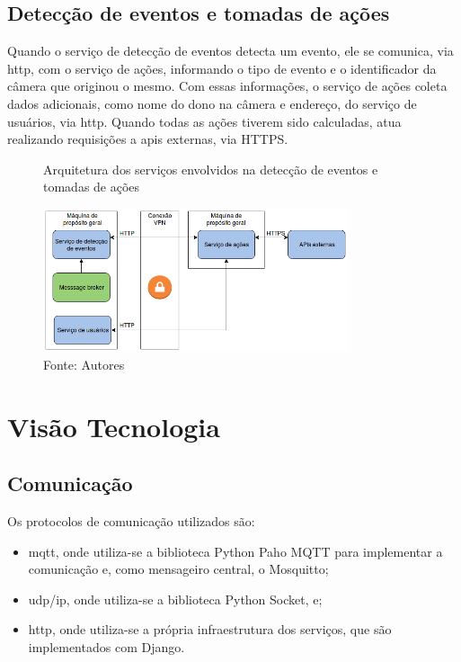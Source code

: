 \documentclass[]{politex}
\begin{document}
\subsection{Detecção de eventos e tomadas de ações}
Quando o serviço de detecção de eventos detecta um evento, ele se comunica, via \acrshort{http}, com o serviço de ações, informando o tipo de evento e o identificador da câmera que originou o mesmo. Com essas informações, o serviço de ações coleta dados adicionais, como nome do dono na câmera e endereço, do serviço de usuários, via \acrshort{http}. Quando todas as ações tiverem sido calculadas, atua realizando requisições a \acrshort{api}s externas, via HTTPS.

\begin{figure}[H]
    \centering
    \caption{Arquitetura dos serviços envolvidos na detecção de eventos e tomadas de ações}
    \includegraphics[width=0.8\textwidth]{arquitetura_acoes}
    \caption*{Fonte: Autores}
    \label{fig:arquitetura_acoes}
\end{figure}

\section{Visão Tecnologia}

\subsection{Comunicação}
Os protocolos de comunicação utilizados são:
\begin{itemize}
    \item \acrshort{mqtt}, onde utiliza-se a biblioteca Python Paho MQTT para implementar a comunicação e, como mensageiro central, o Mosquitto;
    \item \acrlong{udp}/\acrshort{ip}, onde utiliza-se a biblioteca Python Socket, e;
    \item \acrshort{http}, onde utiliza-se a própria infraestrutura dos serviços, que são implementados com Django.
\end{itemize}
\end{document}
